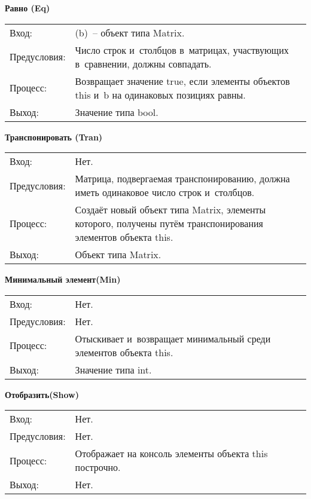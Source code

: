 \documentclass[a4paper,14pt]{extreport}
\begin{document}
\noindent
\begin{minipage}{\textwidth}
	\vspace{1em}
	{\bf Равно (Eq)}
	\flushright
	\begin{tabularx}{.95\textwidth}{lX}
		Вход: & (b) – объект типа Matrix.\\
		Предусловия: & Число строк и столбцов в матрицах, участвующих в сравнении, должны совпадать.\\
		Процесс: & Возвращает значение true, если элементы объектов this и b на одинаковых позициях равны.\\
		Выход: & Значение типа bool.
	\end{tabularx}
\end{minipage}

\noindent
\begin{minipage}{\textwidth}
	\vspace{1em}
	{\bf Транспонировать (Tran)}
	\flushright
	\begin{tabularx}{.95\textwidth}{lX}
		Вход: & Нет.\\
		Предусловия: & Матрица, подвергаемая транспонированию, должна иметь одинаковое число строк и столбцов.\\
		Процесс: & Создаёт новый объект типа Matrix, элементы которого, получены путём транспонирования элементов объекта this.\\
		Выход: & Объект типа Matrix.
	\end{tabularx}
\end{minipage}

\noindent
\begin{minipage}{\textwidth}
	\vspace{1em}
	{\bf Минимальный элемент(Min)}
	\flushright
	\begin{tabularx}{.95\textwidth}{lX}
		Вход: & Нет.\\
		Предусловия: & Нет.\\
		Процесс: & Отыскивает и возвращает минимальный среди элементов объекта this.\\
		Выход: & Значение типа int.\\
	\end{tabularx}
\end{minipage}

\noindent
\begin{minipage}{\textwidth}
	\vspace{1em}
	{\bf Отобразить(Show)}
	\flushright
	\begin{tabularx}{.95\textwidth}{lX}
		Вход: & Нет.\\
		Предусловия: & Нет.\\
		Процесс: & Отображает на консоль элементы объекта this построчно.\\
		Выход: & Нет.
	\end{tabularx}
\end{minipage}
\end{document}
